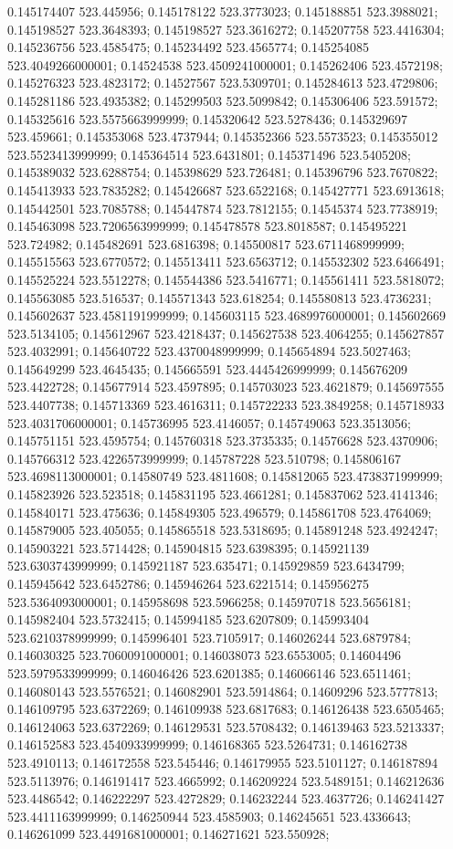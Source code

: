 0.145174407 523.445956; 0.145178122 523.3773023; 0.145188851 523.3988021; 0.145198527 523.3648393; 0.145198527 523.3616272; 0.145207758 523.4416304; 0.145236756 523.4585475; 0.145234492 523.4565774; 0.145254085 523.4049266000001; 0.14524538 523.4509241000001; 0.145262406 523.4572198; 0.145276323 523.4823172; 0.14527567 523.5309701; 0.145284613 523.4729806; 0.145281186 523.4935382; 0.145299503 523.5099842; 0.145306406 523.591572; 0.145325616 523.5575663999999; 0.145320642 523.5278436; 0.145329697 523.459661; 0.145353068 523.4737944; 0.145352366 523.5573523; 0.145355012 523.5523413999999; 0.145364514 523.6431801; 0.145371496 523.5405208; 0.145389032 523.6288754; 0.145398629 523.726481; 0.145396796 523.7670822; 0.145413933 523.7835282; 0.145426687 523.6522168; 0.145427771 523.6913618; 0.145442501 523.7085788; 0.145447874 523.7812155; 0.14545374 523.7738919; 0.145463098 523.7206563999999; 0.145478578 523.8018587; 0.145495221 523.724982; 0.145482691 523.6816398; 0.145500817 523.6711468999999; 0.145515563 523.6770572; 0.145513411 523.6563712; 0.145532302 523.6466491; 0.145525224 523.5512278; 0.145544386 523.5416771; 0.145561411 523.5818072; 0.145563085 523.516537; 0.145571343 523.618254; 0.145580813 523.4736231; 0.145602637 523.4581191999999; 0.145603115 523.4689976000001; 0.145602669 523.5134105; 0.145612967 523.4218437; 0.145627538 523.4064255; 0.145627857 523.4032991; 0.145640722 523.4370048999999; 0.145654894 523.5027463; 0.145649299 523.4645435; 0.145665591 523.4445426999999; 0.145676209 523.4422728; 0.145677914 523.4597895; 0.145703023 523.4621879; 0.145697555 523.4407738; 0.145713369 523.4616311; 0.145722233 523.3849258; 0.145718933 523.4031706000001; 0.145736995 523.4146057; 0.145749063 523.3513056; 0.145751151 523.4595754; 0.145760318 523.3735335; 0.14576628 523.4370906; 0.145766312 523.4226573999999; 0.145787228 523.510798; 0.145806167 523.4698113000001; 0.14580749 523.4811608; 0.145812065 523.4738371999999; 0.145823926 523.523518; 0.145831195 523.4661281; 0.145837062 523.4141346; 0.145840171 523.475636; 0.145849305 523.496579; 0.145861708 523.4764069; 0.145879005 523.405055; 0.145865518 523.5318695; 0.145891248 523.4924247; 0.145903221 523.5714428; 0.145904815 523.6398395; 0.145921139 523.6303743999999; 0.145921187 523.635471; 0.145929859 523.6434799; 0.145945642 523.6452786; 0.145946264 523.6221514; 0.145956275 523.5364093000001; 0.145958698 523.5966258; 0.145970718 523.5656181; 0.145982404 523.5732415; 0.145994185 523.6207809; 0.145993404 523.6210378999999; 0.145996401 523.7105917; 0.146026244 523.6879784; 0.146030325 523.7060091000001; 0.146038073 523.6553005; 0.14604496 523.5979533999999; 0.146046426 523.6201385; 0.146066146 523.6511461; 0.146080143 523.5576521; 0.146082901 523.5914864; 0.14609296 523.5777813; 0.146109795 523.6372269; 0.146109938 523.6817683; 0.146126438 523.6505465; 0.146124063 523.6372269; 0.146129531 523.5708432; 0.146139463 523.5213337; 0.146152583 523.4540933999999; 0.146168365 523.5264731; 0.146162738 523.4910113; 0.146172558 523.545446; 0.146179955 523.5101127; 0.146187894 523.5113976; 0.146191417 523.4665992; 0.146209224 523.5489151; 0.146212636 523.4486542; 0.146222297 523.4272829; 0.146232244 523.4637726; 0.146241427 523.4411163999999; 0.146250944 523.4585903; 0.146245651 523.4336643; 0.146261099 523.4491681000001; 0.146271621 523.550928; 